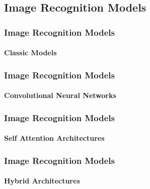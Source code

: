\subsection*{Image Recognition Models}
\begin{frame}[t]
    \frametitle{Image Recognition Models}
    \framesubtitle{Classic Models}
\end{frame}
\begin{frame}[t]
    \frametitle{Image Recognition Models}
    \framesubtitle{Convolutional Neural Networks}
    
\end{frame}
\begin{frame}[t]
    \frametitle{Image Recognition Models}
    \framesubtitle{Self Attention Architectures}
    
\end{frame}
\begin{frame}[t]
    \frametitle{Image Recognition Models}
    \framesubtitle{Hybrid Architectures}
    
\end{frame}